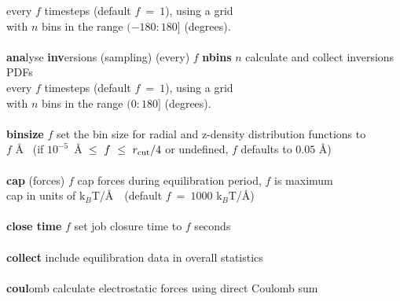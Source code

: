 \begin{tabbing}
\>                                              \> \phantom{xxxxxxxxxxxxxxxxx} every $f$ timesteps (default $f~=~1$), using a grid \\
\>                                              \> \phantom{xxxxxxxxxxxxxxxxx} with $n$ bins in the range $(-180:180]$ (degrees). \\
\>                                              \> \\
\> {\bf ana}lyse {\bf inv}ersions (sampling) (every) $f$ {\bf nbins} $n$
                                                \> \phantom{xxxxxxxxxxxxxxxxx} calculate and collect inversions PDFs \\
\>                                              \> \phantom{xxxxxxxxxxxxxxxxx} every $f$ timesteps (default $f~=~1$), using a grid \\
\>                                              \> \phantom{xxxxxxxxxxxxxxxxx} with $n$ bins in the range $(0:180]$ (degrees). \\
\>                                              \> \\
\> {\bf binsize} $f$                            \> set the bin size for radial and z-density distribution functions to \\
\>                                              \> $f$ \AA~ (if $10^{-5}$~\AA~$\le~f~\le~r_{\rm cut}/4$ or undefined, $f$ defaults to $0.05$ \AA) \\
\>                                              \> \\
\> {\bf cap} (forces) $f$                       \> cap forces during equilibration period, $f$ is maximum \\
\>                                              \> cap in units of k$_{B}$T/\AA~~(default $f~=~1000$ k$_{B}$T/\AA) \\
\>                                              \> \\
\> {\bf close time} $f$                         \> set job closure time to $f$ seconds \\
\>                                              \> \\
\> {\bf collect}                                \> include equilibration data in overall statistics \\
\>                                              \> \\
\> {\bf coul}omb                                \> calculate electrostatic forces using direct Coulomb sum \\

\end{tabbing}
